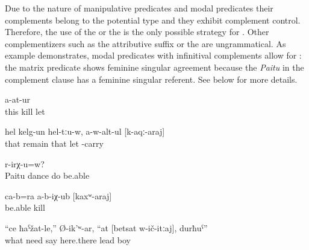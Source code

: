Due to the nature of manipulative predicates and modal predicates their complements belong to the potential type and they exhibit complement control. Therefore, the use of the  or the  is the only possible strategy for  . Other complementizers such as the attributive suffix or the  are ungrammatical. As example  demonstrates, modal predicates with infinitival complements allow for : the matrix predicate shows feminine singular agreement because the   \textit{Paitu} in the complement clause has a feminine singular referent. See  below for more details.
%
\begin{exe}
	\ex	\label{ex:He did not allow (them) to kill him}
		a-at-ur\\
		this	kill	let\\
	\glt	{}

	\ex	\label{ex:‎‎‎He (the dead body) remained there, not being allowed to bring him (to Sanzhi)}
	\gll	hel	kelg-un	hel-tːu-w,	a-w-alt-ul	[k-aqː-araj]\\
		that	remain	that	let	-carry\\
	\glt	{}

	\ex	\label{ex:‎Is Paitu able to dance}
		r-irχ-u=w?\\
		Paitu	dance	do	be.able\\
	\glt	{}

	\ex	\label{ex:They themselves were not able to kill them}
	\gll	ca-b=ra	a-b-iχ-ub	[kaxʷ-araj]\\
			be.able	kill\\
	\glt	{}

	\ex	\label{ex:‎‎‎What need is there for you, (he) said, to move here and there, boy}
	\gll	``ce	ħaˁžat-le,''	Ø-ik'ʷ-ar,	``at	[betsat	w-ič-itːaj],	durħuˁ''\\
		what	need	say			here.there	lead	boy\\
	\glt	{}
\end{exe}

